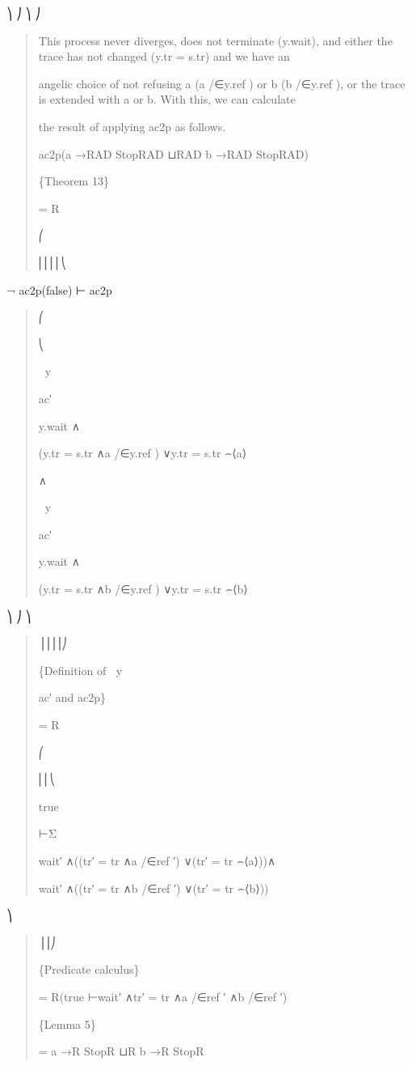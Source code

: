 \documentclass[11pt]{article}
\begin{document}
⎞ ⎠ ⎞ ⎠

\begin{quote}\small\raggedright
This process never diverges, does not terminate (y.wait), and either the trace has not changed (y.tr = s.tr) and we have an
\par
angelic choice of not refusing a (a /∈y.ref ) or b (b /∈y.ref ), or the trace is extended with a or b. With this, we can calculate
\par
the result of applying ac2p as follows.
\par
ac2p(a →RAD StopRAD ⊔RAD b →RAD StopRAD)
\par
\{Theorem 13\}
\par
= R
\par
⎛
\par
⎜⎜⎜⎜⎝
\end{quote}

¬ ac2p(false) ⊢ ac2p

\begin{quote}\small\raggedright
⎛
\par
⎝
\par
∈⃝y
\par
ac′
\par
y.wait ∧
\par
(y.tr = s.tr ∧a /∈y.ref ) ∨y.tr = s.tr ⌢⟨a⟩
\par
∧
\par
∈⃝y
\par
ac′
\par
y.wait ∧
\par
(y.tr = s.tr ∧b /∈y.ref ) ∨y.tr = s.tr ⌢⟨b⟩
\end{quote}

⎞ ⎠ ⎞

\begin{quote}\small\raggedright
⎟⎟⎟⎟⎠
\par
\{Definition of ∈⃝y
\par
ac′ and ac2p\}
\par
= R
\par
⎛
\par
⎜⎜⎝
\par
true
\par
⊢Σ
\par
wait′ ∧((tr′ = tr ∧a /∈ref ′) ∨(tr′ = tr ⌢⟨a⟩))∧
\par
wait′ ∧((tr′ = tr ∧b /∈ref ′) ∨(tr′ = tr ⌢⟨b⟩))
\end{quote}

⎞

\begin{quote}\small\raggedright
⎟⎟⎠
\par
\{Predicate calculus\}
\par
= R(true ⊢wait′ ∧tr′ = tr ∧a /∈ref ′ ∧b /∈ref ′)
\par
\{Lemma 5\}
\par
= a →R StopR ⊔R b →R StopR
\end{quote}
\end{document}
